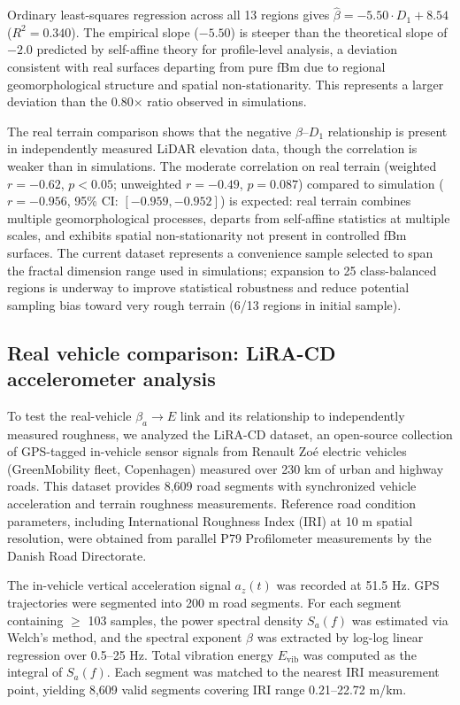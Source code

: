 \documentclass[11pt]{article}
\begin{document}
Ordinary least-squares regression across all 13 regions gives $\hat{\beta} = -5.50 \cdot D_1 + 8.54$ ($R^2 = 0.340$). The empirical slope ($-5.50$) is steeper than the theoretical slope of $-2.0$ predicted by self-affine theory for profile-level analysis, a deviation consistent with real surfaces departing from pure fBm due to regional geomorphological structure and spatial non-stationarity. This represents a larger deviation than the 0.80$\times$ ratio observed in simulations.

The real terrain comparison shows that the negative $\beta$--$D_1$ relationship is present in independently measured LiDAR elevation data, though the correlation is weaker than in simulations. The moderate correlation on real terrain (weighted $r = -0.62$, $p < 0.05$; unweighted $r = -0.49$, $p = 0.087$) compared to simulation ($r = -0.956$, 95\% CI: $[-0.959, -0.952]$) is expected: real terrain combines multiple geomorphological processes, departs from self-affine statistics at multiple scales, and exhibits spatial non-stationarity not present in controlled fBm surfaces. The current dataset represents a convenience sample selected to span the fractal dimension range used in simulations; expansion to 25 class-balanced regions is underway to improve statistical robustness and reduce potential sampling bias toward very rough terrain (6/13 regions in initial sample).


\subsection*{Real vehicle comparison: LiRA-CD accelerometer analysis}

To test the real-vehicle $\beta_a \rightarrow E$ link and its relationship to independently measured roughness, we analyzed the LiRA-CD dataset\cite{Skar2023}, an open-source collection of GPS-tagged in-vehicle sensor signals from Renault Zo\'{e} electric vehicles (GreenMobility fleet, Copenhagen) measured over 230 km of urban and highway roads. This dataset provides 8,609 road segments with synchronized vehicle acceleration and terrain roughness measurements. Reference road condition parameters, including International Roughness Index (IRI) at 10 m spatial resolution, were obtained from parallel P79 Profilometer measurements by the Danish Road Directorate.

The in-vehicle vertical acceleration signal $a_z(t)$ was recorded at 51.5 Hz. GPS trajectories were segmented into 200 m road segments. For each segment containing $\geq$ 103 samples, the power spectral density $S_a(f)$ was estimated via Welch's method, and the spectral exponent $\beta$ was extracted by log-log linear regression over 0.5--25 Hz. Total vibration energy $E_{\mathrm{vib}}$ was computed as the integral of $S_a(f)$. Each segment was matched to the nearest IRI measurement point, yielding 8,609 valid segments covering IRI range 0.21--22.72 m/km.
\end{document}
